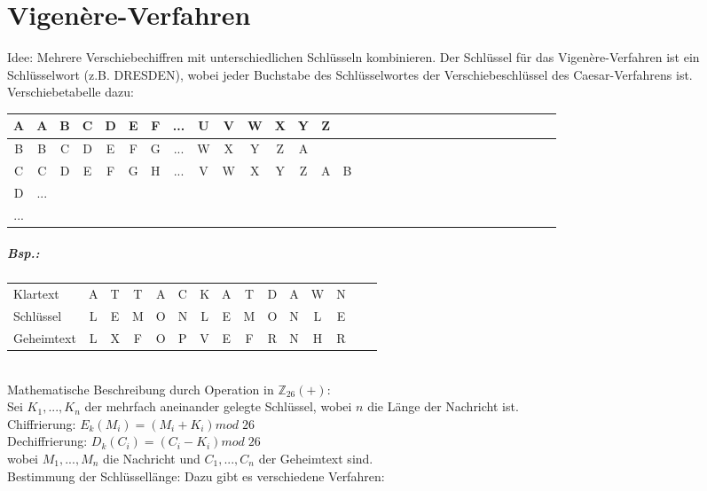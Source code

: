 \section{Vigenère-Verfahren}
Idee: Mehrere Verschiebechiffren mit unterschiedlichen Schlüsseln kombinieren. Der Schlüssel für das Vigenère-Verfahren ist ein Schlüsselwort (z.B. DRESDEN), wobei jeder Buchstabe des Schlüsselwortes der Verschiebeschlüssel des Caesar-Verfahrens ist.\\
Verschiebetabelle dazu:\\
\begin{tabular}{ c| c c c c c c c c c c c c c c c c c c c c c c c c c c c c c c}
A&A&B&C&D&E&F&...&U&V&W&X&Y&Z\\
\hline
B & B & C & D & E &F& G& ...   & W & X & Y & Z &A\\
C & C &D&E&F&G&H&...&V&W&X&Y&Z&A&B\\
D & ...\\
...
\end{tabular}
\subparagraph{Bsp.:} \parskp
\begin{tabular}{l c c c c c c c c c c c c c c }
Klartext & A&T&T&A&C&K&A&T&D&A&W&N\\
Schlüssel & L&E&M&O&N&L&E&M&O&N&L&E\\
Geheimtext & L&X&F&O&P&V&E&F&R&N&H&R
\end{tabular}\\
Mathematische Beschreibung durch Operation in $\mathbb{Z}_{26}(+)$:\\
Sei $K_1, ... ,K_n$ der mehrfach aneinander gelegte Schlüssel, wobei $n$ die Länge der Nachricht ist.\\
Chiffrierung: $E_k(M_i)=(M_i+K_i)mod\;26$\\
Dechiffrierung: $D_k(C_i)=(C_i-K_i)mod \; 26$\\
wobei $M_1, ..., M_n$ die Nachricht und $C_1, ..., C_n$ der Geheimtext sind.\\
Bestimmung der Schlüssellänge: Dazu gibt es verschiedene Verfahren:
